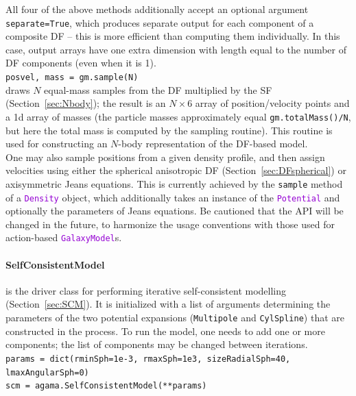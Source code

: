 \documentclass[12pt]{article}
\newcommand{\ttt}[1]{\textcolor{darkviolet}{\texttt{#1}}}
\newcommand{\ppp}[1]{\textcolor{darkolive} {\texttt{#1}}}
\begin{document}
All four of the above methods additionally accept an optional argument \texttt{separate=True}, which produces separate output for each component of a composite DF -- this is more efficient than computing them individually. In this case, output arrays have one extra dimension with length equal to the number of DF components (even when it is 1).
\\[2mm]
\texttt{posvel, mass = gm.sample(N)}\\
draws $N$ equal-mass samples from the DF multiplied by the SF (Section~\ref{sec:Nbody}); the result is an $N\times6$ array of position/velocity points and a 1d array of masses (the particle masses approximately equal \texttt{gm.totalMass()/N}, but here the total mass is computed by the sampling routine). This routine is used for constructing an $N$-body representation of the DF-based model.
\\[2mm]
One may also sample positions from a given density profile, and then assign velocities using either the spherical anisotropic DF (Section~\ref{sec:DFspherical}) or axisymmetric Jeans equations. This is currently achieved by the \texttt{sample} method of a \ttt{Density} object, which additionally takes an instance of the \ttt{Potential} and optionally the parameters of Jeans equations. Be cautioned that the API will be changed in the future, to harmonize the usage conventions with those used for action-based \ttt{GalaxyModel}s.

\paragraph{SelfConsistentModel} is the driver class for performing iterative self-consistent modelling (Section~\ref{sec:SCM}). It is initialized with a list of arguments determining the parameters of the two potential expansions (\ppp{Multipole} and \ppp{CylSpline}) that are constructed in the process. To run the model, one needs to add one or more components; the list of components may be changed between iterations.\\
\texttt{params = dict(rminSph=1e-3, rmaxSph=1e3, sizeRadialSph=40, lmaxAngularSph=0)}\\
\texttt{scm = agama.SelfConsistentModel(**params)}
\end{document}
